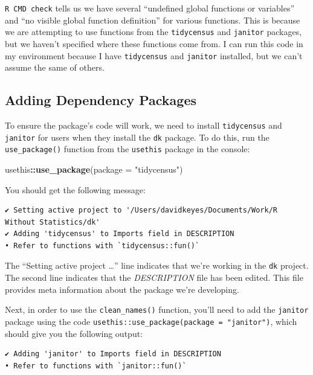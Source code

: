 \documentclass[
]{book}
\newenvironment{Shaded}{\begin{snugshade}}{\end{snugshade}}
\newcommand{\AttributeTok}[1]{\textcolor[rgb]{0.13,0.29,0.53}{#1}}
\newcommand{\FunctionTok}[1]{\textcolor[rgb]{0.13,0.29,0.53}{\textbf{#1}}}
\newcommand{\NormalTok}[1]{#1}
\newcommand{\SpecialCharTok}[1]{\textcolor[rgb]{0.81,0.36,0.00}{\textbf{#1}}}
\newcommand{\StringTok}[1]{\textcolor[rgb]{0.31,0.60,0.02}{#1}}
\begin{document}
\texttt{R\ CMD\ check} tells us we have several ``undefined global functions or variables'' and ``no visible global function definition'' for various functions. This is because we are attempting to use functions from the \texttt{tidycensus} and \texttt{janitor} packages, but we haven't specified where these functions come from. I can run this code in my environment because I have \texttt{tidycensus} and \texttt{janitor} installed, but we can't assume the same of others.

\hypertarget{adding-dependency-packages}{%
\subsection*{Adding Dependency Packages}\label{adding-dependency-packages}}

To ensure the package's code will work, we need to install \texttt{tidycensus} and \texttt{janitor} for users when they install the \texttt{dk} package. To do this, run the \texttt{use\_package()} function from the \texttt{usethis} package in the console:

\begin{Shaded}
\begin{Highlighting}[]
\NormalTok{usethis}\SpecialCharTok{::}\FunctionTok{use\_package}\NormalTok{(}\AttributeTok{package =} \StringTok{"tidycensus"}\NormalTok{)}
\end{Highlighting}
\end{Shaded}

You should get the following message:

\begin{verbatim}
✔ Setting active project to '/Users/davidkeyes/Documents/Work/R Without Statistics/dk'
✔ Adding 'tidycensus' to Imports field in DESCRIPTION
• Refer to functions with `tidycensus::fun()`
\end{verbatim}

The ``Setting active project \ldots{}'' line indicates that we're working in the \texttt{dk} project. The second line indicates that the \emph{DESCRIPTION} file has been edited. This file provides meta information about the package we're developing.

Next, in order to use the \texttt{clean\_names()} function, you'll need to add the \texttt{janitor} package using the code \texttt{usethis::use\_package(package\ =\ "janitor")}, which should give you the following output:

\begin{verbatim}
✔ Adding 'janitor' to Imports field in DESCRIPTION
• Refer to functions with `janitor::fun()`
\end{verbatim}
\end{document}
